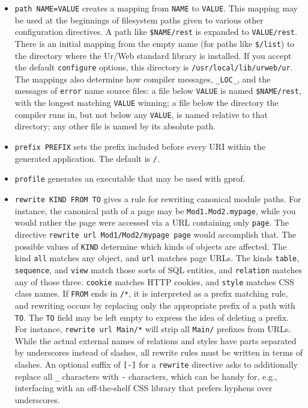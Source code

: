 \documentclass{article}
\newcommand{\cd}[1]{\texttt{#1}}
\begin{document}
\begin{itemize}
\item \texttt{path NAME=VALUE} creates a mapping from \texttt{NAME} to \texttt{VALUE}.  This mapping may be used at the beginnings of filesystem paths given to various other configuration directives.  A path like \texttt{\$NAME/rest} is expanded to \texttt{VALUE/rest}.  There is an initial mapping from the empty name (for paths like \texttt{\$/list}) to the directory where the Ur/Web standard library is installed.  If you accept the default \texttt{configure} options, this directory is \texttt{/usr/local/lib/urweb/ur}.  The mappings also determine how compiler messages, \texttt{\_LOC\_}, and the messages of \texttt{error} name source files: a file below \texttt{VALUE} is named \texttt{\$NAME/rest}, with the longest matching \texttt{VALUE} winning; a file below the directory the compiler runs in, but not below any \texttt{VALUE}, is named relative to that directory; any other file is named by its absolute path.
\item \texttt{prefix PREFIX} sets the prefix included before every URI within the generated application.  The default is \texttt{/}.
\item \texttt{profile} generates an executable that may be used with gprof.
\item \texttt{rewrite KIND FROM TO} gives a rule for rewriting canonical module paths.  For instance, the canonical path of a page may be \texttt{Mod1.Mod2.mypage}, while you would rather the page were accessed via a URL containing only \texttt{page}.  The directive \texttt{rewrite url Mod1/Mod2/mypage page} would accomplish that.  The possible values of \texttt{KIND} determine which kinds of objects are affected.  The kind \texttt{all} matches any object, and \texttt{url} matches page URLs.  The kinds \texttt{table}, \texttt{sequence}, and \texttt{view} match those sorts of SQL entities, and \texttt{relation} matches any of those three.  \texttt{cookie} matches HTTP cookies, and \texttt{style} matches CSS class names.  If \texttt{FROM} ends in \texttt{/*}, it is interpreted as a prefix matching rule, and rewriting occurs by replacing only the appropriate prefix of a path with \texttt{TO}.  The \texttt{TO} field may be left empty to express the idea of deleting a prefix.  For instance, \texttt{rewrite url Main/*} will strip all \texttt{Main/} prefixes from URLs.  While the actual external names of relations and styles have parts separated by underscores instead of slashes, all rewrite rules must be written in terms of slashes.  An optional suffix of \cd{[-]} for a \cd{rewrite} directive asks to additionally replace all \cd{\_} characters with \cd{-} characters, which can be handy for, e.g., interfacing with an off-the-shelf CSS library that prefers hyphens over underscores.

\end{itemize}
\end{document}
